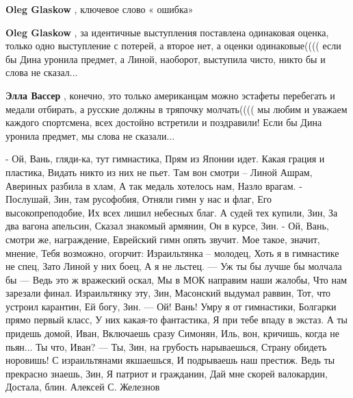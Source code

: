 \begin{itemize}
\begin{itemize}
\textbf{Oleg Glaskow} , ключевое слово « ошибка»

 
\textbf{Oleg Glaskow} , за идентичные выступления поставлена одинаковая оценка,
только одно выступление с потерей, а второе нет, а оценки одинаковые(((( если
бы Дина уронила предмет, а Линой, наоборот, выступила чисто, никто бы и слова
не сказал...

 
\textbf{Элла Вассер} , конечно, это только американцам можно эстафеты
перебегать и медали отбирать, а русские должны в тряпочку молчать(((( мы любим
и уважаем каждого спортсмена, всех достойно встретили и поздравили! Если бы
Дина уронила предмет, мы слова не сказали...

 

\obeycr
- Ой, Вань, гляди-ка, тут гимнастика,
Прям из Японии идет.
Какая грация и пластика,
Видать никто из них не пьет.
Там вон смотри – Линой Ашрам,
Авериных разбила в хлам,
А так медаль хотелось нам,
Назло врагам.
- Послушай, Зин, там русофобия,
Отняли гимн у нас и флаг,
Его высокопреподобие,
Их всех лишил небесных благ.
А судей тех купили, Зин,
За два вагона апельсин,
Сказал знакомый армянин,
Он в курсе, Зин.
- Ой, Вань, смотри же, награждение,
Еврейский гимн опять звучит.
Мое такое, значит, мнение,
Тебя возможно, огорчит:
Израильтянка – молодец,
Хоть я в гимнастике не спец,
Зато Линой у них боец,
А я не льстец.
— Уж ты бы лучше бы молчала бы —
Ведь это ж вражеский оскал,
Мы в МОК направим наши жалобы,
Что нам зарезали финал.
Израильтянку эту, Зин,
Масонский выдумал раввин,
Тот, что устроил карантин,
Ей богу, Зин.
— Ой! Вань! Умру я от гимнастики,
Болгарки прямо первый класс,
У них какая-то фантастика,
Я при тебе впаду в экстаз.
А ты придешь домой, Иван,
Включаешь сразу Симонян,
Иль, вон, кричишь, когда не пьян...
Ты что, Иван?
— Ты, Зин, на грубость нарываешься,
Страну обидеть норовишь!
С израильтянами якшаешься,
И подрываешь наш престиж.
Ведь ты прекрасно знаешь, Зин,
Я патриот и гражданин,
Дай мне скорей валокардин,
Достала, блин.
Алексей С. Железнов
\restorecr



\end{itemize}
\end{itemize}

